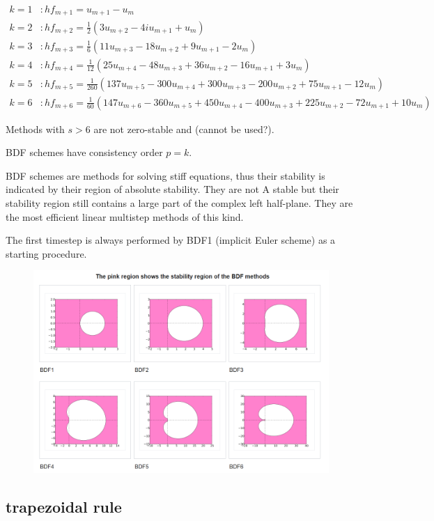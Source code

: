 	\begin{align*}
		k = 1 &: h f_{m+1} = u_{m+1} - u_m \\
		k = 2 &: h f_{m+2} = \frac{1}{2} (3 u_{m+2} - 4 iu_{m+1} + u_m) \\
		k = 3 &: h f_{m+3} = \frac{1}{6} (11 u_{m+3} - 18 u_{m+2} + 9 u_{m+1} - 2 u_m) \\
		k = 4 &: h f_{m+4} = \frac{1}{12} (25 u_{m+4} - 48 u_{m+3} + 36 u_{m+2} - 16 u_{m+1} + 3 u_m) \\
		k = 5 &: h f_{m+5} = \frac{1}{260} (137 u_{m+5} - 300 u_{m+4} + 300 u_{m+3} - 200 u_{m+2} +75 u_{m+1} -12 u_m) \\
		k = 6 &: h f_{m+6} = \frac{1}{60} (147 u_{m+6} - 360 u_{m+5} + 450 u_{m+4} - 400 u_{m+3} + 225 u_{m+2} - 72 u_{m+1} + 10 u_m)
	\end{align*}
	
	Methods with $s > 6$ are not zero-stable and (cannot be used?).
	
	BDF schemes have consistency order $p = k$.
	
	BDF schemes are methods for solving stiff equations, thus their stability is indicated by their region of absolute stability. They are not A stable but their stability region still contains a large part of the complex left half-plane. They are the most efficient linear multistep methods of this kind.
	
	The first timestep is always performed by BDF1 (implicit Euler scheme) as a starting procedure.
	
	\begin{figure}[H]
		\centering
		\includegraphics[width=0.7\linewidth]{screenshot020}
		\caption{}
		\label{fig:screenshot020}
	\end{figure}
	
	
	
	\subsection{trapezoidal rule}
	
